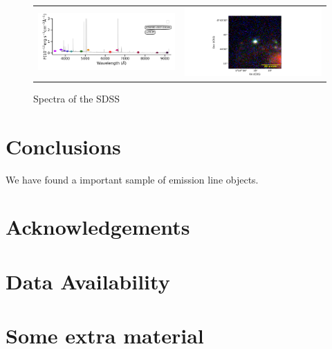 \documentclass[fleqn,usenatbib]{mnras}
\begin{document}
\begin{figure}
\begin{tabular}{ll}
    \includegraphics[trim=10 0 10 20, clip]{Figs/spec-1089-52913-0196-STRIPE82-0007-024265.pdf} & \includegraphics[width=0.4\linewidth, trim=10 0 10 20, clip]{Figs/STRIPE82-0007-024265_3-0_100_r.pdf} \\
  \end{tabular}
  \caption{Spectra of the SDSS}
  \label{fig:color-diagram}
\end{figure}

\section{Conclusions}

We have found a important sample of emission line objects.

\section*{Acknowledgements}


\section*{Data Availability}










\appendix

\section{Some extra material}




\bsp	%
\label{lastpage}
\end{document}
